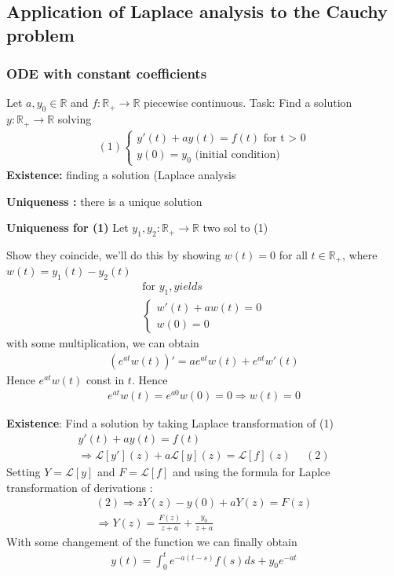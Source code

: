 \subsection{Application of Laplace analysis to the Cauchy problem}
\subsubsection{ODE with constant coefficients}
Let $a, y_0 \in \mathbb{R}$ and $f: \mathbb{R}_+ \rightarrow \mathbb{R}$ piecewise continuous.
Task: Find a solution $y: \mathbb{R}_+ \rightarrow \mathbb{R}$ solving 
\begin{align*}
    (1)\begin{cases}
        y'(t) + ay(t) = f(t) \text{  for t > 0} \\
        y(0) = y_0 \text{ (initial condition)}
    \end{cases}
\end{align*}
\textbf{Existence:} finding a solution (Laplace analysis

\textbf{Uniqueness :} there is a unique solution

\textbf{Uniqueness for (1)}
Let $y_1, y_2: \mathbb{R}_+ \rightarrow \mathbb{R}$ two sol to (1)

Show they coincide, we'll do this by showing $w(t) = 0$ for all $t \in \mathbb{R}_+$, where $w(t) = y_1(t) - y_2(t)$
\begin{align*}
    \text{for } y_1, yields \\
    \begin{cases}
        w'(t) + aw(t) = 0 \\
        w(0) = 0
    \end{cases}
\end{align*}
with some multiplication, we can obtain 
\begin{align*}
    (e^{at}w(t))' = ae^{at}w(t) + e^{at}w'(t)
\end{align*}
Hence $e^{at}w(t)$ const in $t$. Hence 
\begin{align*}
    e^{at}w(t) = e^{a0}w(0) = 0 \Rightarrow w(t) =0
\end{align*}

\textbf{Existence}: Find a solution by taking Laplace transformation of (1)
\begin{align*}
    y'(t) + ay(t) = f(t) \\ \Rightarrow \mathcal{L}[y'](z)  + a\mathcal{L}[y](z) = \mathcal{L}[f](z) \ \ \ \ \ \  (2)
\end{align*}
Setting $Y = \mathcal{L}[y]$ and $F = \mathcal{L}[f]$ and using the formula for Laplce transformation of derivations : 
\begin{align*}
    (2) \Rightarrow zY(z) - y(0) + aY(z) = F(z) \\
    \Rightarrow Y(z) = \frac{F(z)}{z+a} + \frac{y_0}{z+a}
\end{align*}
With some changement of the function we can finally obtain 
\begin{align*}
    y(t) = \int_0^t e^{-a(t-s)}f(s)ds + y_0e^{-at}
\end{align*}

